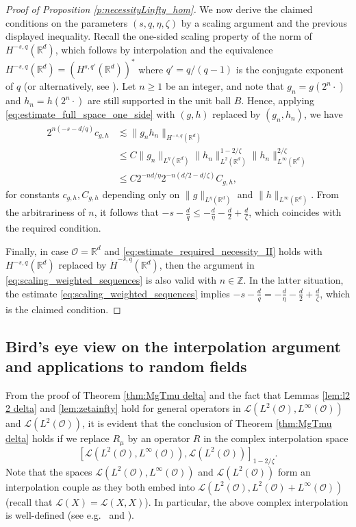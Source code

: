 \documentclass[reqno]{amsart}
\theoremstyle{plain}
\theoremstyle{remark}
\theoremstyle{plain}
\numberwithin{equation}{section}
\newcommand\calL{\mathcal{L}}
\newcommand\cO{\mathcal{O}}
\def\Z{{\mathbb Z}}
\def\R{{\mathbb R}}
\newcommand{\Domm}{\mathcal{O}}
\newcommand{\1}{\one}
\begin{document}
\begin{proof}[Proof of Proposition \ref{p:necessityLinfty_hom}]
We now derive the claimed conditions on the parameters $(s,q,\eta,\zeta)$ by a scaling argument and the previous displayed inequality.
Recall the one-sided scaling property of the norm of $H^{-s,q}(\R^d)$, which follows by interpolation and the equivalence $H^{-s,q}(\R^d)=(H^{s,q'}(\R^d))^*$ where $q'=q/(q-1)$ is the conjugate exponent of $q$ (or alternatively, see \cite[3.4.1 and 2.5.6]{Tri83}). 
Let $n\geq 1$ be an integer, and note that $g_n = g(2^n \cdot)$ and $h_n = h(2^n\cdot)$ are still supported in the unit ball $B$. 
Hence, applying \eqref{eq:estimate_full_space_one_side} with $(g,h)$ replaced by $(g_n,h_n)$, we have 
\begin{align}
\label{eq:scaling_weighted_sequences}
2^{n(-s-d/q)} c_{g,h} & \lesssim \|g_n h_n\|_{H^{-s,q}(\R^d)} 
\\ 
\nonumber
&  \leq C \|g_n\|_{L^\eta(\R^d)} \|h_n\|_{L^2(\R^d)}^{1-2/\zeta}\|h_n\|_{L^\infty(\R^d)}^{2/\zeta}
\\ 
\nonumber
& \leq C 2^{-n d/\eta} 2^{-n(d/2-d/\zeta)} C_{g,h},
\end{align}
for constants $c_{g,h}, C_{g,h}$ depending only on $\|g\|_{L^\eta(\R^d)}$ and $\|h\|_{L^\infty(\R^d)}$.
From the arbitrariness of $n$, it follows that $-s-\frac{d}{q}\leq - \frac{d}{\eta} - \frac{d}{2}+\frac{d}{\zeta}$, which coincides with the required condition.

\smallskip

Finally, in case $\Domm=\R^d$ and \eqref{eq:estimate_required_necessity_II} holds with $H^{-s,q}(\R^d)$ replaced by $\dot{H}^{-s,q}(\R^d)$, then the argument in \eqref{eq:scaling_weighted_sequences} is also valid with $n\in \Z$. In the latter situation, the estimate \eqref{eq:scaling_weighted_sequences} implies $-s-\frac{d}{q}= - \frac{d}{\eta} - \frac{d}{2}+\frac{d}{\zeta}$, which is the claimed condition.
\end{proof}
 




\subsection{Bird's eye view on the interpolation argument and applications to random fields}\label{ss:Bird} 
From the proof of Theorem \ref{thm:MgTmu delta} and the fact that Lemmas \ref{lem:l2 2 delta} and \ref{lem:zetainfty} hold for general operators in $\calL(L^2(\cO),L^\infty(\cO))$ and $\calL(L^2(\cO))$, it is evident that the conclusion of Theorem \ref{thm:MgTmu delta} holds if we replace $R_\mu$ by an operator $R$ in the complex interpolation space
\begin{equation}
\label{eq:interpolation_HS}
[ \calL(L^2(\cO), L^\infty(\cO)),\calL(L^2(\cO))]_{1 - 2/\zeta}.  
\end{equation}
Note that the spaces $\calL(L^2(\cO), L^\infty(\cO))$ and $\calL(L^2(\cO))$ form an interpolation couple as they both embed into $\calL(L^2(\cO), L^2(\cO)+L^\infty(\cO))$ (recall that $\calL(X)=\calL(X,X)$). In particular, the above complex interpolation is well-defined (see e.g.\ \cite[Subsection 2.3]{BeLo} and \cite[Definition C.1.1]{HNVW1}).
\end{document}
